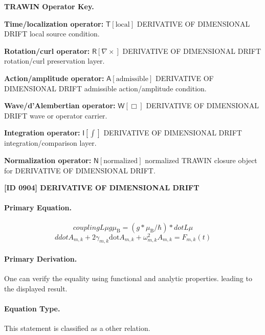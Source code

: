 \par\vspace{0.45\baselineskip}
\noindent\begin{minipage}[t]{\linewidth}
\begingroup
\small
\raggedright
\textbf{TRAWIN Operator Key.}\par
\noindent\textbf{Time/localization operator:} $\mathsf{T}\!\left[\mathrm{local}\right]$ DERIVATIVE OF DIMENSIONAL DRIFT local source condition.\par
\noindent\textbf{Rotation/curl operator:} $\mathsf{R}\!\left[\nabla\times\right]$ DERIVATIVE OF DIMENSIONAL DRIFT rotation/curl preservation layer.\par
\noindent\textbf{Action/amplitude operator:} $\mathsf{A}\!\left[\mathrm{admissible}\right]$ DERIVATIVE OF DIMENSIONAL DRIFT admissible action/amplitude condition.\par
\noindent\textbf{Wave/d'Alembertian operator:} $\mathsf{W}\!\left[\Box\right]$ DERIVATIVE OF DIMENSIONAL DRIFT wave or operator carrier.\par
\noindent\textbf{Integration operator:} $\mathsf{I}\!\left[\int\right]$ DERIVATIVE OF DIMENSIONAL DRIFT integration/comparison layer.\par
\noindent\textbf{Normalization operator:} $\mathsf{N}\!\left[\mathrm{normalized}\right]$ normalized TRAWIN closure object for DERIVATIVE OF DIMENSIONAL DRIFT.\par
\endgroup
\end{minipage}

\clearpage
\noindent\textbf{[ID 0904] DERIVATIVE OF DIMENSIONAL DRIFT}\par
\vspace{0.35em}
\paragraph{Primary Equation.}
\[
coupling L \mu g \mu_{\mathrm{B}} = (g * \mu_{\mathrm{B}}/\hbar) * dot L \mu
\]
\[
ddot A_{m,k} + 2\gamma_{m,k}\mathrm{dot} A_{m,k} + \omega_{m,k}^2 A_{m,k} = F_{m,k}(t)
\]

\paragraph{Primary Derivation.}
One can verify the equality using functional and analytic properties. leading to the displayed result.
\paragraph{Equation Type.}
This statement is classified as a other relation.

